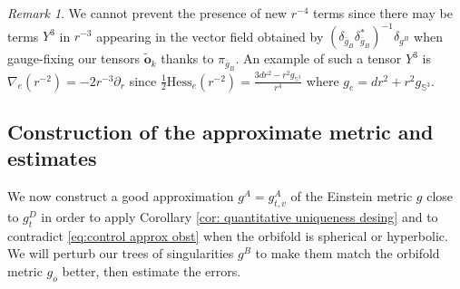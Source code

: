 \documentclass[11pt,reqno]{amsart}
\numberwithin{equation}{section}
\newcommand{\Hess}{\mathrm{Hess}}
\theoremstyle{definition}
\theoremstyle{remark}
\newtheorem{remark}[thm]{Remark}
\begin{document}
\begin{remark}
    We cannot prevent the presence of new $r^{-4}$ terms since there may be terms $Y^3$ in $r^{-3}$ appearing in the vector field obtained by $(\delta_{\bar{g}_B}\delta_{\bar{g}_B}^*)^{-1}\delta_{g^B}$ when gauge-fixing our tensors $\tilde{\mathbf{o}}_k$ thanks to $\pi_{\bar{g}_B}$. An example of such a tensor $Y^3$ is $ \nabla_{e}(r^{-2}) = -2r^{-3}\partial_r$ since $\frac1{2}\Hess_{e}(r^{-2}) = \frac{3dr^2 - r^2g_{\mathbb{S}^3}}{r^4}$ where $g_{e} = dr^2 + r^2g_{\mathbb{S}^3}$. 
\end{remark}

\subsection{Construction of the approximate metric and estimates}\label{sec:approx metric}

We now construct a good approximation $g^A= g^A_{t,v}$ of the Einstein metric $g $ close to $g^D_{t }$ in order to apply Corollary \ref{cor: quantitative uniqueness desing} and to contradict \eqref{eq:control approx obst} when the orbifold is spherical or hyperbolic. We will perturb our trees of singularities $g^B$ to make them match the orbifold metric $g_o$ better, then estimate the errors.
\end{document}
